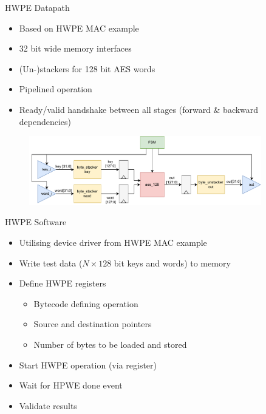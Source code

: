 \documentclass[aspectratio=169, nobackgroundmain]{beamer}
\begin{document}
\begin{frame}[fragile]{HWPE Datapath}

  \begin{itemize}
      \item Based on HWPE MAC example
      \item 32 bit wide memory interfaces
      \item (Un-)stackers for 128 bit AES words
      \item Pipelined operation
      \item Ready/valid handshake between all stages (forward \& backward dependencies)
  \end{itemize}
  
  \begin{figure}
    \raggedleft
    \includegraphics[width=0.9\textwidth]{hwpe_aes.pdf}
\end{figure}
  
\end{frame}

\begin{frame}[fragile]{HWPE Software}

  \begin{itemize}
      \item Utilising device driver from HWPE MAC example
      \item Write test data ($N \times 128$ bit keys and words) to memory
      \item Define HWPE registers \begin{itemize}
        \item Bytecode defining operation
        \item Source and destination pointers
        \item Number of bytes to be loaded and stored
      \end{itemize}
      \item Start HWPE operation (via register)
      \item Wait for HPWE done event
      \item Validate results
  \end{itemize}  
\end{frame}
\end{document}
